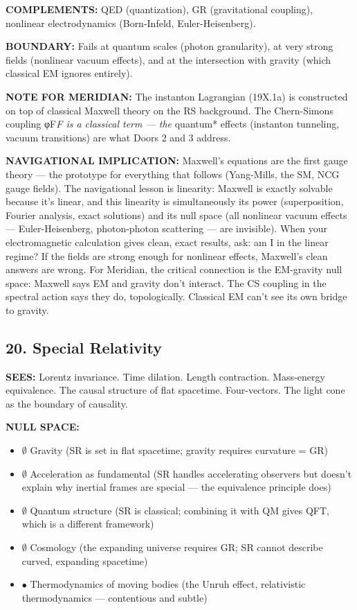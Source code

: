 \textbf{COMPLEMENTS:} QED (quantization), GR (gravitational coupling), nonlinear electrodynamics (Born-Infeld, Euler-Heisenberg).


\textbf{BOUNDARY:} Fails at quantum scales (photon granularity), at very strong fields (nonlinear vacuum effects), and at the intersection with gravity (which classical EM ignores entirely).


\textbf{NOTE FOR MERIDIAN:} The instanton Lagrangian (19X.1a) is constructed on top of classical Maxwell theory on the RS background. The Chern-Simons coupling φF\textit{F is a classical term — the }quantum* effects (instanton tunneling, vacuum transitions) are what Doors 2 and 3 address.


\textbf{NAVIGATIONAL IMPLICATION:} Maxwell's equations are the first gauge theory — the prototype for everything that follows (Yang-Mills, the SM, NCG gauge fields). The navigational lesson is linearity: Maxwell is exactly solvable because it's linear, and this linearity is simultaneously its power (superposition, Fourier analysis, exact solutions) and its null space (all nonlinear vacuum effects — Euler-Heisenberg, photon-photon scattering — are invisible). When your electromagnetic calculation gives clean, exact results, ask: am I in the linear regime? If the fields are strong enough for nonlinear effects, Maxwell's clean answers are wrong. For Meridian, the critical connection is the EM-gravity null space: Maxwell says EM and gravity don't interact. The CS coupling in the spectral action says they do, topologically. Classical EM can't see its own bridge to gravity.


\bigskip\noindent\makebox[\textwidth]{\color{rulegray}\rule{5cm}{0.3pt}}\bigskip


\subsection*{20. Special Relativity}


\textbf{SEES:} Lorentz invariance. Time dilation. Length contraction. Mass-energy equivalence. The causal structure of flat spacetime. Four-vectors. The light cone as the boundary of causality.


\textbf{NULL SPACE:}

\begin{itemize}[nosep,leftmargin=*]
  \item $\emptyset$ Gravity (SR is set in flat spacetime; gravity requires curvature = GR)
  \item $\emptyset$ Acceleration as fundamental (SR handles accelerating observers but doesn't explain why inertial frames are special — the equivalence principle does)
  \item $\emptyset$ Quantum structure (SR is classical; combining it with QM gives QFT, which is a different framework)
  \item $\emptyset$ Cosmology (the expanding universe requires GR; SR cannot describe curved, expanding spacetime)
  \item $\bullet$ Thermodynamics of moving bodies (the Unruh effect, relativistic thermodynamics — contentious and subtle)
\end{itemize}


